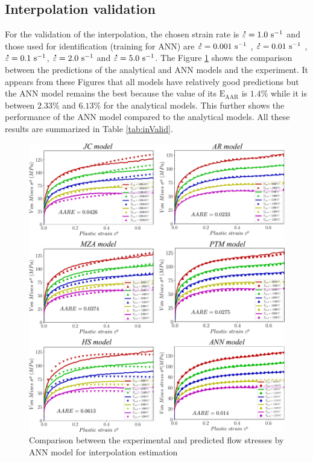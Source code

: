 \documentclass[twoside,english,1p,final,sort&compress]{elsarticle}
\theoremstyle{plain}
\newcommand{\mdot}[1]{\accentset{\mbox{\bfseries .}}{#1}}
\newcommand{\AARE}{\text{E}_\text{AAR}}
\newcommand{\ps}{\text{s}^{-1}}
\begin{document}
\subsection{Interpolation validation}
For the validation of the interpolation, the chosen strain rate is $\mdot\varepsilon = 1.0\ \ps$ and those used for identification (training for ANN) are $\mdot\varepsilon = 0.001\ \ps$ , $\mdot\varepsilon = 0.01\ \ps$ , $\mdot\varepsilon = 0.1\ \ps$, $\mdot\varepsilon = 2.0\ \ps$  and $\mdot\varepsilon = 5.0\ \ps$. The Figure \ref{fig:inCombinaison} shows the comparison between the predictions of the analytical and ANN models and the experiment. It appears from these Figures that all models have relatively good predictions but the ANN model remains the best because the value of its $\AARE$ is $1.4\%$ while it is between $2.33\%$ and $6.13\%$ for the analytical models. This further shows the performance of the ANN model compared to the analytical models. All these results are summarized in Table \ref{tab:inValid}.
\begin{figure}[!ht]
\centering
\includegraphics[width=1.02\columnwidth]
{Figures/inCombinaison}
\caption{Comparison between the experimental and predicted flow stresses by ANN model for interpolation estimation}
\label{fig:inCombinaison}
\end{figure}
\end{document}
